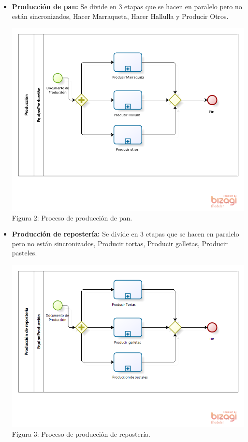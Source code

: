 \begin{itemize}

\item \textbf{Producción de pan:} Se divide en 3 etapas que se hacen en paralelo pero no están sincronizados, Hacer Marraqueta, Hacer Hallulla y Producir Otros.

\begin{center}
\includegraphics[width=13cm]{./imagenes/produccion_pan.png}\\
Figura 2: Proceso de producción de pan.
\end{center}
\newpage
\item \textbf{Producción de repostería:} Se divide en 3 etapas que se hacen en paralelo pero no están sincronizados, Producir tortas, Producir galletas, Producir pasteles.

\begin{center}
\includegraphics[width=13cm]{./imagenes/produccion_reposteria.png}\\
Figura 3: Proceso de producción de repostería.
\end{center}


\end{itemize}

